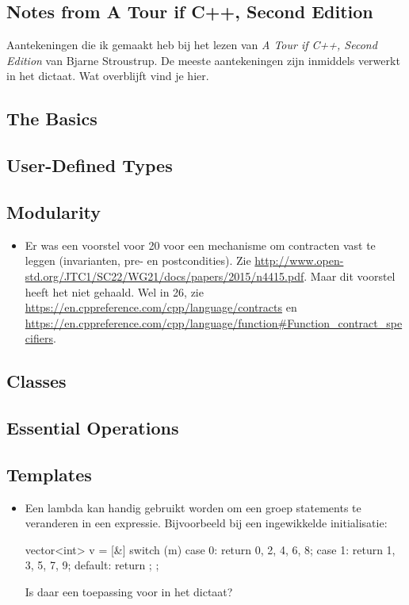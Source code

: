 \begin{cpplstShortInline}
\tableofcontents
\section{Notes from A Tour if C++, Second Edition}
Aantekeningen die ik gemaakt heb bij het lezen van \emph{A Tour if C++, Second Edition} van Bjarne Stroustrup. 
De meeste aantekeningen zijn inmiddels verwerkt in het dictaat.
Wat overblijft vind je hier.

\subsection{The Basics}
\subsection{User-Defined Types}
\subsection{Modularity}
\begin{itemize}
	\item 
	Er was een voorstel voor \Cpp{}20 voor een mechanisme om contracten vast te leggen (invarianten, pre- en postcondities).
	Zie \url{http://www.open-std.org/JTC1/SC22/WG21/docs/papers/2015/n4415.pdf}. Maar dit voorstel heeft het niet gehaald.
	Wel in \Cpp{}26, zie \url{https://en.cppreference.com/cpp/language/contracts} en \url{https://en.cppreference.com/cpp/language/function#Function_contract_specifiers}.
\end{itemize}
\subsection{Classes}
\subsection{Essential Operations}
\subsection{Templates}
\begin{itemize}
	\item 
	Een lambda kan handig gebruikt worden om een groep statements te veranderen in een expressie.
	Bijvoorbeeld bij een ingewikkelde initialisatie:
\begin{cpplstfragment}
	vector<int> v = [&] {
		switch (m) {
			case 0:
			return {0, 2, 4, 6, 8};
			case 1:
			return {1, 3, 5, 7, 9};
			default:
			return {};
		}
	};
\end{cpplstfragment}
	Is daar een toepassing voor in het dictaat?
\end{itemize}


\end{cpplstShortInline}
